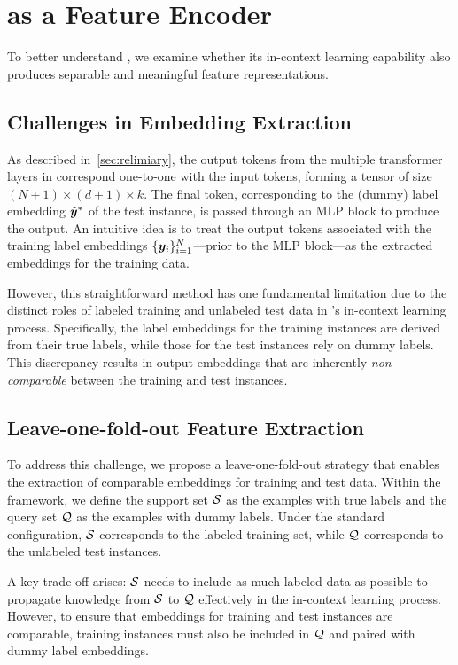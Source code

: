 \section{\ours as a Feature Encoder}
To better understand \ours, we examine whether its in-context learning capability also produces separable and meaningful feature representations.

\subsection{Challenges in Embedding Extraction}
As described in~\autoref{sec:relimiary}, the output tokens from the multiple transformer layers in \ours correspond one-to-one with the input tokens, forming a tensor of size $(N+1) \times (d+1) \times k$. The final token, corresponding to the (dummy) label embedding $\tilde{{\bm{y}}}^*$ of the test instance, is passed through an MLP block to produce the output. An intuitive idea is to treat the output tokens associated with the training label embeddings $\{{\bm{y}}_i\}_{i=1}^N$—prior to the MLP block—as the extracted embeddings for the training data.

However, this straightforward method has one fundamental limitation due to the distinct roles of labeled training and unlabeled test data in \ours's in-context learning process. Specifically, the label embeddings for the training instances are derived from their true labels, while those for the test instances rely on dummy labels. This discrepancy results in output embeddings that are inherently {\em non-comparable} between the training and test instances. 

\subsection{Leave-one-fold-out Feature Extraction}
To address this challenge, we propose a leave-one-fold-out strategy that enables the extraction of comparable embeddings for training and test data. Within the \ours framework, we define the support set ${\mathcal{S}}$ as the examples with true labels and the query set ${\mathcal{Q}}$ as the examples with dummy labels. Under the standard configuration, ${\mathcal{S}}$ corresponds to the labeled training set, while ${\mathcal{Q}}$ corresponds to the unlabeled test instances.

A key trade-off arises: ${\mathcal{S}}$ needs to include as much labeled data as possible to propagate knowledge from ${\mathcal{S}}$ to ${\mathcal{Q}}$ effectively in the in-context learning process. However, to ensure that embeddings for training and test instances are comparable, training instances must also be included in ${\mathcal{Q}}$ and paired with dummy label embeddings.

